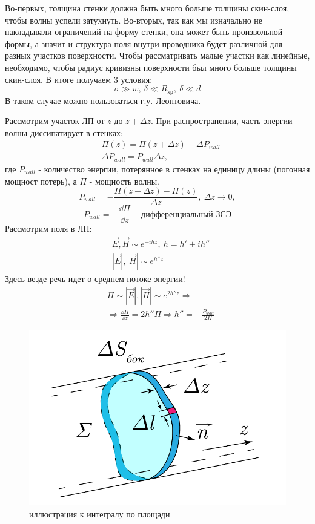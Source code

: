 Во-первых, толщина стенки должна быть много больше толщины скин-слоя, чтобы волны успели затухнуть. Во-вторых, так как
мы  изначально не накладывали ограничений на форму стенки, она может быть произвольной формы, а значит и структура поля внутри
проводника будет различной для разных участков поверхности. Чтобы рассматривать малые участки как линейные, необходимо,
чтобы радиус кривизны поверхности был много больше толщины скин-слоя. В итоге получаем 3 условия:
\begin{equation}
	\sigma\gg w, ~ \delta \ll R_{\text{кр}}, ~ \delta \ll d
\end{equation}
В таком случае можно пользоваться г.у. Леонтовича.

Рассмотрим участок ЛП от $z$ до $z+\Delta z$. При распространении, часть энергии волны диссипатирует в стенках:
\begin{align*}
	& \Pi(z) = \Pi(z+\Delta z)+\Delta P_{wall}\\
	& \Delta P_{wall} = P_{wall}\Delta z,
\end{align*}
где $ P_{wall}$ - количество энергии, потерянное в стенках на единицу длины (погонная мощност потерь), а $\Pi$ - мощность волны.
\begin{equation}
	P_{wall} = -\frac{\Pi(z+\Delta z)-\Pi(z)}{\Delta z},~\Delta z \to 0,	
\end{equation}
\begin{equation}
	P_{wall} = -\frac{\dd \Pi}{\dd z} - \text{дифференциальный ЗСЭ}
\end{equation}
Рассмотрим поля в ЛП:
\begin{align*}
	&\vec{E},\vec{H} \sim e^{-ihz},~ h =h'+ih''\\
	&|\vec{E}|,|\vec{H}| \sim e^{h''z}
\end{align*}
Здесь везде речь идет о среднем потоке энергии!
\begin{align*}
	&\Pi \sim |\vec{E}|,|\vec{H}|\sim e^{2h''z} \Rightarrow\\
	& \Rightarrow \frac{\dd \Pi}{\dd z} = 2h'' \Pi \Rightarrow h'' = -\frac{P_{wall}}{2 \Pi}
\end{align*}
\begin{figure}[h!]
	\centering
	\includegraphics[width = 0.4\linewidth]{img/9-1-3.pdf}
	\caption{иллюстрация к интегралу по площади}
\end{figure}
